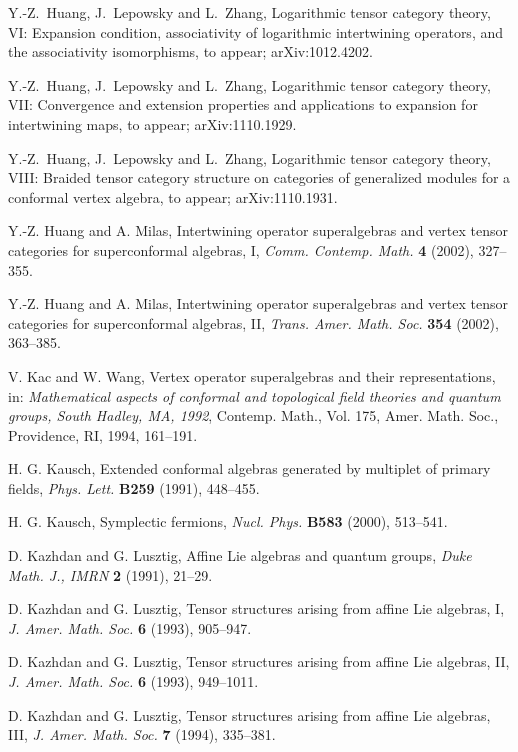 \documentclass[12pt]{article}
\begin{document}
\begin{thebibliography}{FGST2}
 Y.-Z.~Huang, J.~Lepowsky and L.~Zhang, Logarithmic
tensor category theory, VI: Expansion condition, associativity of logarithmic
intertwining operators, and the associativity isomorphisms, to appear; arXiv:1012.4202.

 Y.-Z.~Huang, J.~Lepowsky and L.~Zhang, Logarithmic
tensor category theory, VII: Convergence and extension
properties and applications to expansion for intertwining
maps, to appear; arXiv:1110.1929.

 Y.-Z.~Huang, J.~Lepowsky and L.~Zhang, Logarithmic
tensor category theory, VIII: Braided tensor category
structure on categories of generalized modules for a
conformal vertex algebra, to appear; arXiv:1110.1931.

Y.-Z. Huang and A. Milas, Intertwining operator
superalgebras and vertex tensor categories for superconformal
algebras, I, {\em Comm. Contemp. Math.} {\bf 4} (2002), 327--355.

 Y.-Z. Huang and A. Milas, Intertwining operator
superalgebras and vertex tensor categories for superconformal
algebras, II, {\em Trans. Amer. Math. Soc.} {\bf 354} (2002),
363--385.

V. Kac and W. Wang, Vertex operator superalgebras and their
representations, in: {\em Mathematical aspects of conformal and
topological field theories and quantum groups, South Hadley, MA,
1992}, Contemp. Math., Vol. 175, Amer. Math. Soc., Providence,
RI, 1994, 161--191.

 H. G. Kausch, Extended conformal algebras
generated by multiplet of primary fields, {\em Phys. Lett.} {\bf B259}
(1991), 448--455.

 H. G. Kausch, Symplectic fermions, {\em Nucl. Phys.} {\bf
B583} (2000), 513--541.

D. Kazhdan and G. Lusztig,
Affine Lie algebras and quantum groups,
{\em Duke Math. J., IMRN} {\bf 2} (1991), 21--29.

D. Kazhdan and G. Lusztig,
Tensor structures arising {from} affine Lie algebras, I,
{\em J. Amer. Math. Soc.} {\bf 6} (1993), 905--947.

D. Kazhdan and G. Lusztig,
Tensor structures arising {from} affine Lie algebras, II,
{\em J. Amer. Math. Soc.} {\bf 6} (1993), 949--1011.

D. Kazhdan and G. Lusztig,
Tensor structures arising {from} affine Lie algebras, III, {\em J.
Amer. Math. Soc.} {\bf 7} (1994), 335--381.


\end{thebibliography}
\end{document}
